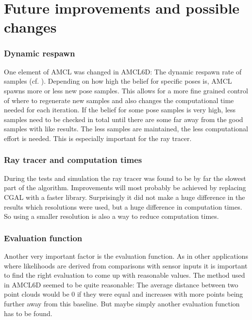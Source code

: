 \documentclass[Thesis.tex]{subfiles}
\begin{document}
\chapter{Future improvements and possible changes}

\subsection*{Dynamic respawn}

One element of \gls{AMCL} was changed in \gls{AMCL6D}: The dynamic respawn rate of samples (cf. \cite{ThrunBurgardFox:2005}). Depending on how high the belief for specific poses is, \gls{AMCL} spawns more or less new pose samples. This allows for a more fine grained control of where to regenerate new samples and also changes the computational time needed for each iteration. If the belief for some pose samples is very high, less samples need to be checked in total until there are some far away from the good samples with like results. The less samples are maintained, the less computational effort is needed. This is especially important for the ray tracer.

\subsection*{Ray tracer and computation times}

During the tests and simulation the ray tracer was found to be by far the slowest part of the algorithm. Improvements will most probably be achieved by replacing \gls{CGAL} with a faster library. Surprisingly it did not make a huge difference in the results which resolutions were used, but a huge difference in computation times. So using a smaller resolution is also a way to reduce computation times.

\subsection*{Evaluation function}

Another very important factor is the evaluation function. As in other applications where likelihoods are derived from comparisons with sensor inputs it is important to find the right evaluation to come up with reasonable values. The method used in \gls{AMCL6D} seemed to be quite reasonable: The average distance between two point clouds would be 0 if they were equal and increases with more points being further away from this baseline. But maybe simply another evaluation function has to be found. 
\end{document}
